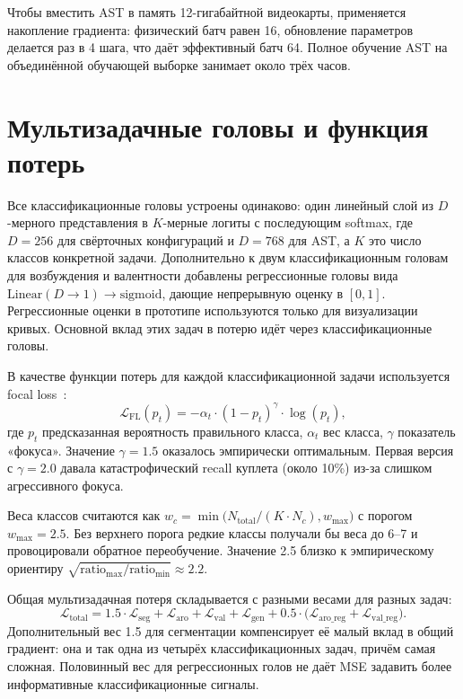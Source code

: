 Чтобы вместить AST в память 12-гигабайтной видеокарты, применяется накопление градиента: физический батч равен 16, обновление параметров делается раз в 4 шага, что даёт эффективный батч 64. Полное обучение AST на объединённой обучающей выборке занимает около трёх часов.

\section{Мультизадачные головы и функция потерь}\label{sec:4-6}

Все классификационные головы устроены одинаково: один линейный слой из $D$-мерного представления в $K$-мерные логиты с последующим softmax, где $D = 256$ для свёрточных конфигураций и $D = 768$ для AST, а $K$ это число классов конкретной задачи. Дополнительно к двум классификационным головам для возбуждения и валентности добавлены регрессионные головы вида $\text{Linear}(D \to 1) \to \text{sigmoid}$, дающие непрерывную оценку в $[0, 1]$. Регрессионные оценки в прототипе используются только для визуализации кривых. Основной вклад этих задач в потерю идёт через классификационные головы.

В качестве функции потерь для каждой классификационной задачи используется focal loss~\cite{lin2017focal}:
\[
\mathcal{L}_{\text{FL}}(p_t) = -\alpha_t \cdot (1 - p_t)^\gamma \cdot \log(p_t),
\]
где $p_t$ предсказанная вероятность правильного класса, $\alpha_t$ вес класса, $\gamma$ показатель «фокуса». Значение $\gamma = 1.5$ оказалось эмпирически оптимальным. Первая версия с $\gamma = 2.0$ давала катастрофический recall куплета (около 10\%) из-за слишком агрессивного фокуса.

Веса классов считаются как $w_c = \min\big( N_{\text{total}} / (K \cdot N_c), w_{\max} \big)$ с порогом $w_{\max} = 2.5$. Без верхнего порога редкие классы получали бы веса до 6--7 и провоцировали обратное переобучение. Значение 2.5 близко к эмпирическому ориентиру $\sqrt{\text{ratio}_{\max} / \text{ratio}_{\min}} \approx 2.2$.

Общая мультизадачная потеря складывается с разными весами для разных задач:
\[
\mathcal{L}_{\text{total}} = 1.5 \cdot \mathcal{L}_{\text{seg}} + \mathcal{L}_{\text{aro}} + \mathcal{L}_{\text{val}} + \mathcal{L}_{\text{gen}} + 0.5 \cdot \big( \mathcal{L}_{\text{aro\_reg}} + \mathcal{L}_{\text{val\_reg}} \big).
\]
Дополнительный вес 1.5 для сегментации компенсирует её малый вклад в общий градиент: она и так одна из четырёх классификационных задач, причём самая сложная. Половинный вес для регрессионных голов не даёт MSE задавить более информативные классификационные сигналы.


